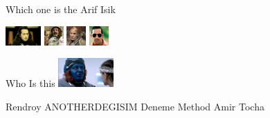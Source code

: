\documentclass{exam}
\begin{document}
\begin{questions}
\question Which one is the Arif Isik\newline
\begin{oneparchoices}
\choice \includegraphics[height=2em]{komutanlogar.jpeg}
\choice \includegraphics[height=2em]{faruk.jpg}
\choice \includegraphics[height=2em]{216.jpg}
\choice \includegraphics[height=2em]{arifisik.jpg}
\end{oneparchoices}
\question Who Is this\newline
\includegraphics[height=3em]{rendroy2.jpg} \newline
\begin{oneparchoices}
\choice Rendroy
\choice ANOTHERDEGISIM
\choice Deneme Method
\choice Amir Tocha
\end{oneparchoices}
\end{questions}
\end{document}
